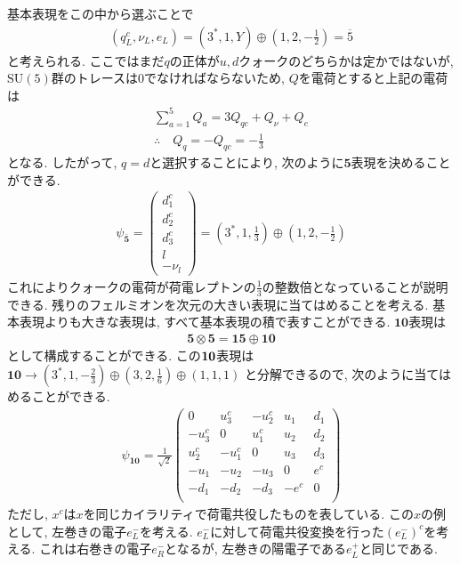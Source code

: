 基本表現をこの中から選ぶことで
\begin{align}
  (q_L^c, \nu_L, e_L) = (3^*, 1, Y)\oplus\left(1,2,-\frac{1}{2}\right) = \overline{5}
\end{align}
と考えられる.
ここではまだ$q$の正体が$u, d$クォークのどちらかは定かではないが, $\mathrm{SU}(5)$群のトレースは0でなければならないため, $Q$を電荷とすると上記の電荷は
\begin{align}
  \sum_{a=1}^5 Q_a = 3Q_{qc}+Q_\nu + Q_e\nonumber\\
  \therefore\quad Q_q = -Q_{qc} = -\frac{1}{3}\label{quantum_Q}
\end{align}
となる.
したがって, $q=d$と選択することにより, 次のように$\bm{5}$表現を決めることができる.
\begin{align}
 \psi_{\bar{\bm{5}}} =\begin{pmatrix}
    d_1 ^c \\
    d_2 ^c \\
    d_3 ^c \\
    l      \\
    -\nu_l
  \end{pmatrix}=\left({3}^*,1,\frac{1}{3}\right)\oplus \left(1,2,-\frac{1}{2}\right)\label{GUT-5rep}
\end{align}
これによりクォークの電荷が荷電レプトンの$\frac{1}{3}$の整数倍となっていることが説明できる.
残りのフェルミオンを次元の大きい表現に当てはめることを考える.
基本表現よりも大きな表現は, すべて基本表現の積で表すことができる.
${\bm{10}}$表現は
\begin{align}
  \bm{5}\otimes\bm{5} = \bm{15}\oplus\bm{10}\nonumber
\end{align}
として構成することができる.
この$\bf{10}$表現は$\bm{10}\rightarrow (3^*,1,-\frac{2}{3})\oplus(3,2,\frac{1}{6})\oplus(1,1,1)$
と分解できるので, 次のように当てはめることができる.
\begin{align}
\psi_{{\bm{10}}} = \frac{1}{\sqrt{2}}\begin{pmatrix}
         0 &  u_3^c & -u_2^c & u_1 & d_1 \\
    -u_3^c &      0 &  u_1^c & u_2 & d_2 \\
     u_2^c & -u_1^c &      0 & u_3 & d_3 \\
    -u_1   &   -u_2 &   -u_3 &   0 & e^c \\
      -d_1 &   -d_2 &   -d_3 &-e^c &   0 \\
    \end{pmatrix}\label{GUT-10rep}
\end{align}
ただし, $x^c$は$x$を同じカイラリティで荷電共役したものを表している.
この$x$の例として, 左巻きの電子$e^-_L$を考える.
$e^-_L$に対して荷電共役変換を行った$(e^-_L)^c$を考える.
これは右巻きの電子$e_R^-$となるが, 左巻きの陽電子である$e_L^+$と同じである.
